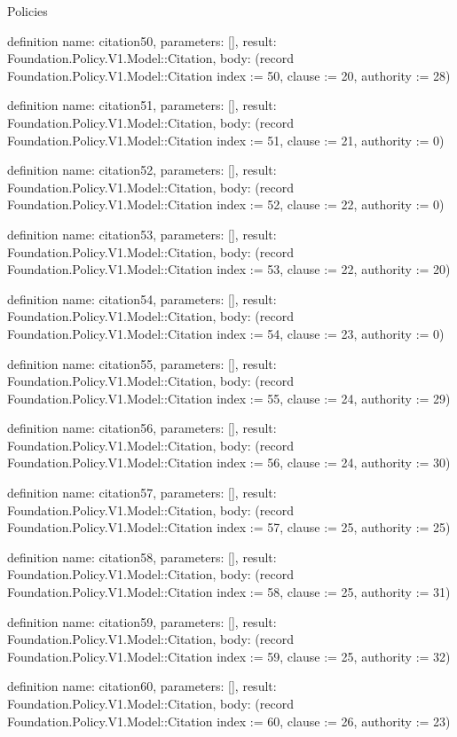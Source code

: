 \begin{lexlean}{Policies}
\begin{semanticmodule}
definition{
  name: citation50,
  parameters: [],
  result: Foundation.Policy.V1.Model::Citation,
  body: (record Foundation.Policy.V1.Model::Citation {index := 50, clause := 20, authority := 28})
}

definition{
  name: citation51,
  parameters: [],
  result: Foundation.Policy.V1.Model::Citation,
  body: (record Foundation.Policy.V1.Model::Citation {index := 51, clause := 21, authority := 0})
}

definition{
  name: citation52,
  parameters: [],
  result: Foundation.Policy.V1.Model::Citation,
  body: (record Foundation.Policy.V1.Model::Citation {index := 52, clause := 22, authority := 0})
}

definition{
  name: citation53,
  parameters: [],
  result: Foundation.Policy.V1.Model::Citation,
  body: (record Foundation.Policy.V1.Model::Citation {index := 53, clause := 22, authority := 20})
}

definition{
  name: citation54,
  parameters: [],
  result: Foundation.Policy.V1.Model::Citation,
  body: (record Foundation.Policy.V1.Model::Citation {index := 54, clause := 23, authority := 0})
}

definition{
  name: citation55,
  parameters: [],
  result: Foundation.Policy.V1.Model::Citation,
  body: (record Foundation.Policy.V1.Model::Citation {index := 55, clause := 24, authority := 29})
}

definition{
  name: citation56,
  parameters: [],
  result: Foundation.Policy.V1.Model::Citation,
  body: (record Foundation.Policy.V1.Model::Citation {index := 56, clause := 24, authority := 30})
}

definition{
  name: citation57,
  parameters: [],
  result: Foundation.Policy.V1.Model::Citation,
  body: (record Foundation.Policy.V1.Model::Citation {index := 57, clause := 25, authority := 25})
}

definition{
  name: citation58,
  parameters: [],
  result: Foundation.Policy.V1.Model::Citation,
  body: (record Foundation.Policy.V1.Model::Citation {index := 58, clause := 25, authority := 31})
}

definition{
  name: citation59,
  parameters: [],
  result: Foundation.Policy.V1.Model::Citation,
  body: (record Foundation.Policy.V1.Model::Citation {index := 59, clause := 25, authority := 32})
}

definition{
  name: citation60,
  parameters: [],
  result: Foundation.Policy.V1.Model::Citation,
  body: (record Foundation.Policy.V1.Model::Citation {index := 60, clause := 26, authority := 23})
}


\end{semanticmodule}
\end{lexlean}

